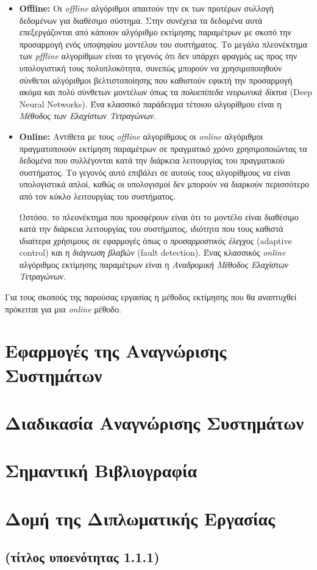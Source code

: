 \begin{itemize}
	\item{\textbf{Offline:} Οι \textit{offline} αλγόριθμοι απαιτούν την εκ των προτέρων συλλογή δεδομένων για διαθέσιμο σύστημα. Στην συνέχεια τα δεδομένα αυτά επεξεργάζονται από κάποιον αλγόριθμο εκτίμησης παραμέτρων με σκοπό την προσαρμογή ενός υποψηφίου μοντέλου του συστήματος. Το μεγάλο πλεονέκτημα των \textit{pffline} αλγορίθμων είναι το γεγονός ότι δεν υπάρχει φραγμός ως προς την υπολογιστική τους πολυπλοκότητα, συνεπώς μπορούν να χρησιμοποιηθούν σύνθετοι αλγόριθμοι βελτιστοποίησης που καθιστούν εφικτή την προσαρμογή ακόμα και πολύ σύνθετων μοντέλων όπως τα \textit{πολυεπίπεδα νευρωνικά δίκτυα} (Deep Neural Networks). Ένα κλασσικό παράδειγμα τέτοιου αλγορίθμου είναι η \textit{Μέθοδος των Ελαχίστων Τετραγώνων}.
	}
		
	\item{\textbf{Online:} Αντίθετα με τους \textit{offline} αλγορίθμους οι \textit{online} αλγόριθμοι πραγματοποιούν εκτίμηση παραμέτρων σε πραγματικό χρόνο χρησιμοποιώντας τα δεδομένα που συλλέγονται κατά την διάρκεια λειτουργίας του πραγματικού συστήματος. Το γεγονός αυτό επιβάλει σε αυτούς τους αλγορίθμους να είναι υπολογιστικά απλοί, καθώς οι υπολογισμοί δεν μπορούν να διαρκούν περισσότερο από τον κύκλο λειτουργίας του συστήματος. 
		
	Ωστόσο, το πλεονέκτημα που προσφέρουν είναι ότι το μοντέλο είναι διαθέσιμο κατά την διάρκεια λειτουργίας του συστήματος, ιδιότητα που τους καθιστά ιδιαίτερα χρήσιμους σε εφαρμογές όπως ο \textit{προσαρμοστικός έλεγχος} (adaptive control) και η \textit{διάγνωση βλαβών} (fault detection). Ένας κλασσικός \textit{online} αλγόριθμος εκτίμησης παραμέτρων είναι η \textit{Αναδρομική Μέθοδος Ελαχίστων Τετραγώνων}.
	}
\end{itemize}

Για τους σκοπούς της παρούσας εργασίας η μέθοδος εκτίμησης που θα αναπτυχθεί πρόκειται για μια \textit{online} μέθοδο.


\section{Εφαρμογές της Αναγνώρισης Συστημάτων}

\section{Διαδικασία Αναγνώρισης Συστημάτων}

\section{Σημαντική Βιβλιογραφία}

\section{Δομή της Διπλωματικής Εργασίας}

\subsection{(τίτλος υποενότητας 1.1.1)}



